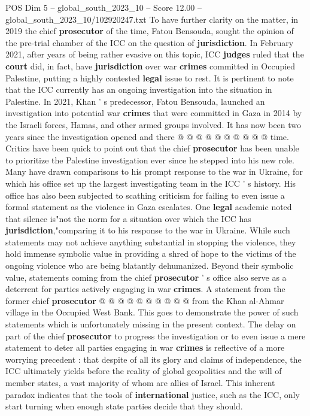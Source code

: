 \begin{textsample}{POS Dim 5 – global\_south\_2023\_10 – Score 12.00 – global\_south\_2023\_10/102920247.txt}
To have further clarity on the matter, in 2019 the chief \textbf{prosecutor} of the time, Fatou Bensouda, sought the opinion of the pre-trial chamber of the ICC on the question of \textbf{jurisdiction}.
In February 2021, after years of being rather evasive on this topic, ICC \textbf{judges} ruled that the \textbf{court} did, in fact, have \textbf{jurisdiction} over war \textbf{crimes} committed in Occupied Palestine, putting a highly contested \textbf{legal} issue to rest.
It is pertinent to note that the ICC currently has an ongoing investigation into the situation in Palestine.
In 2021, Khan ' s predecessor, Fatou Bensouda, launched an investigation into potential war \textbf{crimes} that were committed in Gaza in 2014 by the Israeli forces, Hamas, and other armed groups involved.
It has now been two years since the investigation opened and there @ @ @ @ @ @ @ @ @ @ time.
Critics have been quick to point out that the chief \textbf{prosecutor} has been unable to prioritize the Palestine investigation ever since he stepped into his new role.
Many have drawn comparisons to his prompt response to the war in Ukraine, for which his office set up the largest investigating team in the ICC ' s history.
His office has also been subjected to scathing criticism for failing to even issue a formal statement as the violence in Gaza escalates.
One \textbf{legal} academic noted that silence is"not the norm for a situation over which the ICC has \textbf{jurisdiction},"comparing it to his response to the war in Ukraine.
While such statements may not achieve anything substantial in stopping the violence, they hold immense symbolic value in providing a shred of hope to the victims of the ongoing violence who are being blatantly dehumanized.
Beyond their symbolic value, statements coming from the chief \textbf{prosecutor} ' s office also serve as a deterrent for parties actively engaging in war \textbf{crimes}.
A statement from the former chief \textbf{prosecutor} @ @ @ @ @ @ @ @ @ @ from the Khan al-Ahmar village in the Occupied West Bank.
This goes to demonstrate the power of such statements which is unfortunately missing in the present context.
The delay on part of the chief \textbf{prosecutor} to progress the investigation or to even issue a mere statement to deter all parties engaging in war \textbf{crimes} is reflective of a more worrying precedent : that despite of all its glory and claims of independence, the ICC ultimately yields before the reality of global geopolitics and the will of member states, a vast majority of whom are allies of Israel.
This inherent paradox indicates that the tools of \textbf{international} justice, such as the ICC, only start turning when enough state parties decide that they should.

\end{textsample}
